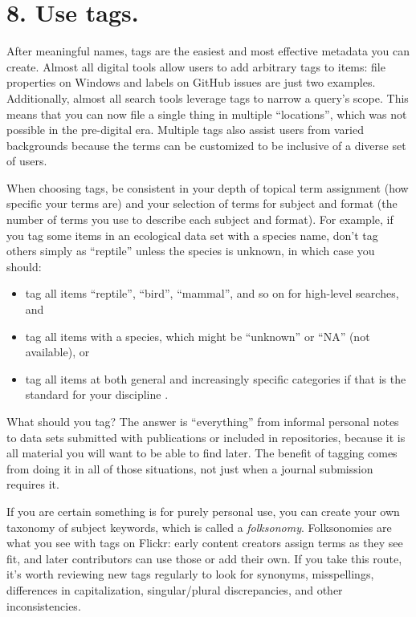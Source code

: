 \documentclass[10pt,letterpaper]{article}
\newcommand{\rulemajor}[1]{\section*{#1}}
\begin{document}
\rulemajor{8. Use tags.}

After meaningful names, tags are the easiest and most effective metadata you can
create. Almost all digital tools allow users to add arbitrary tags to items:
file properties on Windows and labels on GitHub issues are just two examples.
Additionally, almost all search tools leverage tags to narrow a query's scope.
This means that you can now file a single thing in multiple ``locations'', which
was not possible in the pre-digital era. Multiple tags also assist users from
varied backgrounds because the terms can be customized to be inclusive of a
diverse set of users.

When choosing tags, be consistent in your depth of topical term assignment (how
specific your terms are) and your selection of terms for subject and format (the
number of terms you use to describe each subject and format). For example, if
you tag some items in an ecological data set with a species name, don't tag
others simply as ``reptile'' unless the species is unknown, in which case you
should:

\begin{itemize}

\item
  tag all items ``reptile'', ``bird'', ``mammal'', and so on for high-level
  searches, and

\item
  tag all items with a species, which might be ``unknown'' or ``NA'' (not
  available), or
  
\item
  tag all items at both general and increasingly specific categories if that is
  the standard for your discipline \cite{FAIR2020}.

\end{itemize}

What should you tag?  The answer is ``everything'' from informal personal notes
to data sets submitted with publications or included in repositories, because it
is all material you will want to be able to find later. The benefit of tagging
comes from doing it in all of those situations, not just when a journal
submission requires it.

If you are certain something is for purely personal use, you can create your own
taxonomy of subject keywords, which is called a \emph{folksonomy}. Folksonomies
are what you see with tags on Flickr: early content creators assign terms as
they see fit, and later contributors can use those or add their own. If you
take this route, it's worth reviewing new tags regularly to look for synonyms,
misspellings, differences in capitalization, singular/plural discrepancies, and
other inconsistencies.
\end{document}
